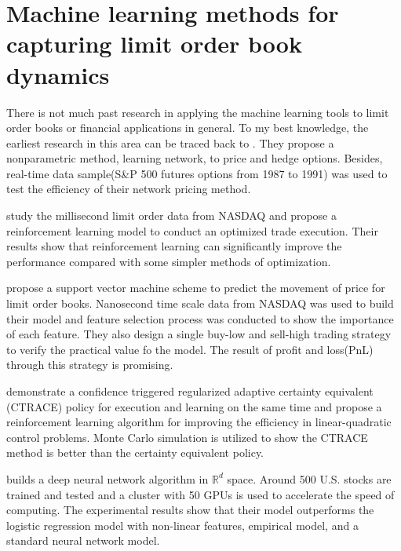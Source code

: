 \section{Machine learning methods for capturing limit order book dynamics}
There is not much past research in applying the machine learning tools to limit order books or financial applications in general. To my best knowledge, the earliest research in this area can be traced back to \cite{hutchinson1994nonparametric}. They propose a nonparametric method, learning network, to price and hedge options. Besides, real-time data sample(S\&P 500 futures options from 1987 to 1991) was used to test the efficiency of their network pricing method. 

\cite{nevmyvaka2006reinforcement} study the millisecond limit order data from NASDAQ and propose a reinforcement learning model to conduct an optimized trade execution. Their results show that reinforcement learning can significantly improve the performance compared with some simpler methods of optimization.

\cite{kercheval2015modelling} propose a support vector machine scheme to predict the movement of price for limit order books. Nanosecond time scale data from NASDAQ was used to build their model and feature selection process was conducted to show the importance of each feature. They also design a single buy-low and sell-high trading strategy to verify the practical value fo the model. The result of profit and loss(PnL) through this strategy is promising.

\cite{park2015adaptive} demonstrate a confidence triggered regularized adaptive certainty equivalent (CTRACE) policy for execution and learning on the same time and propose a reinforcement learning algorithm for improving the efficiency in linear-quadratic control problems. Monte Carlo simulation is utilized to show the CTRACE method is better than the certainty equivalent policy. 

\cite{sirignano2016deep} builds a deep neural network algorithm in $\mathbb{R}^d$ space. Around 500 U.S. stocks are trained and tested and a cluster with 50 GPUs is used to accelerate the speed of computing. The experimental results show that their model outperforms the logistic regression model  with non-linear features, empirical model,  and a standard neural network model.

